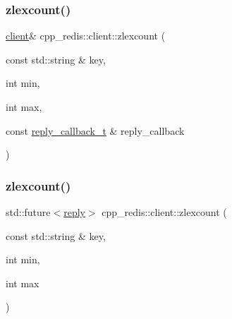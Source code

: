 \mbox{\label{classcpp__redis_1_1client_ad4a8fef29a047724ad4e97eedfb53c62}} 
\subsubsection{\texorpdfstring{zlexcount()}{zlexcount()}\hspace{0.1cm}{\footnotesize\ttfamily [1/6]}}
{\footnotesize\ttfamily \hyperlink{classcpp__redis_1_1client}{client}\& cpp\+\_\+redis\+::client\+::zlexcount (\begin{DoxyParamCaption}\item[{const std\+::string \&}]{key,  }\item[{int}]{min,  }\item[{int}]{max,  }\item[{const \hyperlink{classcpp__redis_1_1client_a061a1140d36d2eaeda82b09a0bb3f9f2}{reply\+\_\+callback\+\_\+t} \&}]{reply\+\_\+callback }\end{DoxyParamCaption})}

\mbox{\label{classcpp__redis_1_1client_aff60a1181d93d961f6ca1903522ce899}} 
\subsubsection{\texorpdfstring{zlexcount()}{zlexcount()}\hspace{0.1cm}{\footnotesize\ttfamily [2/6]}}
{\footnotesize\ttfamily std\+::future$<$\hyperlink{classcpp__redis_1_1reply}{reply}$>$ cpp\+\_\+redis\+::client\+::zlexcount (\begin{DoxyParamCaption}\item[{const std\+::string \&}]{key,  }\item[{int}]{min,  }\item[{int}]{max }\end{DoxyParamCaption})}

\mbox{\label{classcpp__redis_1_1client_aba1b2a6c750b13b1a632ebc8ca90cf60}} 
